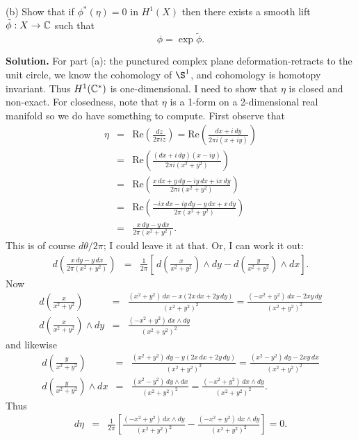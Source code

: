 \documentclass[10pt]{article}
\numberwithin{equation}{subsection}
\begin{document}
(b) Show that if $\phi^*(\eta)=0$ in $H^1(X)$ then there exists a smooth
lift $\tilde\phi:X\to \mathbb{C}$ such that
$$
	\phi=\exp\tilde\phi.
$$

\textbf{Solution.}  For part (a):  the punctured complex plane
deformation-retracts to the unit circle, we know the cohomology of $\S^1$, and
cohomology is homotopy invariant.  Thus $H^1(\mathbb{C}^*)$ is one-dimensional.  I need
to show that $\eta$ is closed and non-exact.  For closedness, note that $\eta$
is a 1-form on a 2-dimensional real manifold so we do have something to
compute.  First observe that
\begin{eqnarray*}
	\eta &=& \mathrm{Re}\left(\frac{dz}{2\pi iz}\right)
	= \mathrm{Re}\left(\frac{dx+i\,dy}{2\pi i(x+iy)}\right) \\
	&=& \mathrm{Re}\left(\frac{(dx+i\,dy)(x-iy)}{2\pi i(x^2+y^2)}\right) \\
	&=& \mathrm{Re}\left(\frac{x\,dx+y\,dy -iy\,dx + ix\,dy}
		{2\pi i(x^2+y^2)}\right) \\
	&=& \mathrm{Re}\left(\frac{-ix\,dx-iy\,dy -y\,dx + x\,dy}
		{2\pi (x^2+y^2)}\right) \\
	&=& \frac{x\,dy - y\,dx}{2\pi (x^2+y^2)}.
\end{eqnarray*}
This is of course $d\theta/2\pi$; I could leave it at that.  Or, I can work it
out:
\begin{eqnarray*}
	d\left(\frac{x\,dy - y\,dx}{2\pi (x^2+y^2)}\right)
	&=& \frac{1}{2\pi}\left[\,d\left(\frac{x}{x^2+y^2}\right)\wedge dy
		- d\left(\frac{y}{x^2+y^2}\right)\wedge dx\right].
\end{eqnarray*}
Now
\begin{eqnarray*}
	d\left(\frac{x}{x^2+y^2}\right)
		&=& \frac{(x^2+y^2)\,dx - x(2x\,dx+2y\,dy)}{(x^2+y^2)^2}
		= \frac{(-x^2+y^2)\,dx - 2xy\,dy}{(x^2+y^2)^2} \\
	d\left(\frac{x}{x^2+y^2}\right) \wedge dy
		&=& \frac{(-x^2+y^2)\,dx \wedge dy}{(x^2+y^2)^2}
\end{eqnarray*}
and likewise
\begin{eqnarray*}
	d\left(\frac{y}{x^2+y^2}\right)
		&=& \frac{(x^2+y^2)\,dy - y(2x\,dx+2y\,dy)}{(x^2+y^2)^2}
		= \frac{(x^2-y^2)\,dy - 2xy\,dx}{(x^2+y^2)^2} \\
	d\left(\frac{y}{x^2+y^2}\right) \wedge dx
		&=& \frac{(x^2-y^2)\,dy \wedge dx}{(x^2+y^2)^2}
		= \frac{(-x^2+y^2)\,dx \wedge dy}{(x^2+y^2)^2}.
\end{eqnarray*}
Thus
\begin{eqnarray*}
	d\eta
	&=& \frac{1}{2\pi}
		\left[
		\frac{(-x^2+y^2)\,dx \wedge dy}{(x^2+y^2)^2} -
		\frac{(-x^2+y^2)\,dx \wedge dy}{(x^2+y^2)^2}
		\right]
	= 0.
\end{eqnarray*}
\end{document}
